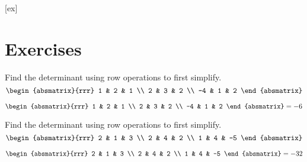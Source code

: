 [ex]
\section*{Exercises}

\begin{enumialphparenastyle}

\begin{ex} Find the determinant using row operations to first simplify. 
\begin{equation*}
\begin{absmatrix}{rrr}
1 & 2 & 1 \\
2 & 3 & 2 \\
-4 & 1 & 2
\end{absmatrix}
\end{equation*}
\begin{sol}
\begin{equation*}
\begin{absmatrix}{rrr}
1 & 2 & 1 \\
2 & 3 & 2 \\
-4 & 1 & 2
\end{absmatrix} = -6
\end{equation*}
\end{sol}
\end{ex}

\begin{ex} Find the determinant using row operations to first simplify.
\begin{equation*}
\begin{absmatrix}{rrr}
2 & 1 & 3 \\
2 & 4 & 2 \\
1 & 4 & -5
\end{absmatrix}
\end{equation*}
\begin{sol}
\begin{equation*}
\begin{absmatrix}{rrr}
2 & 1 & 3 \\
2 & 4 & 2 \\
1 & 4 & -5
\end{absmatrix} = -32
\end{equation*}
\end{sol}
\end{ex}


\end{enumialphparenastyle}

